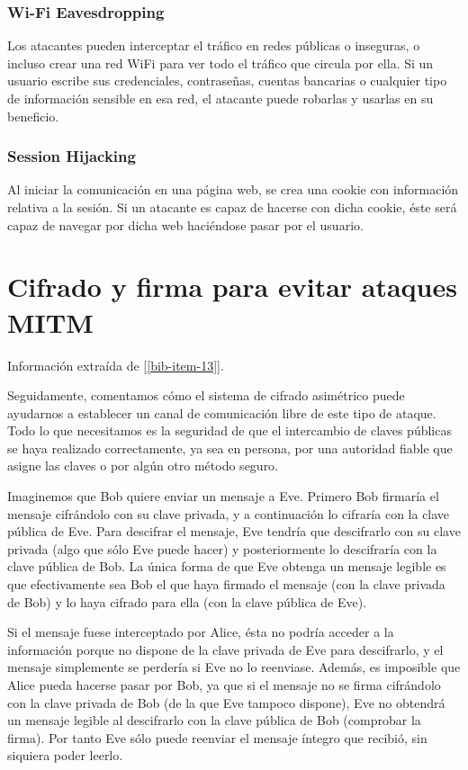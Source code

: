 \documentclass[11pt]{article}
\begin{document}
 \subsubsection*{Wi-Fi Eavesdropping}
 
 Los atacantes pueden interceptar el tráfico en redes públicas o inseguras, o incluso crear una red WiFi para ver todo el tráfico que circula por ella. Si un usuario escribe sus credenciales, contraseñas, cuentas bancarias o cualquier tipo de información sensible en esa red, el atacante puede robarlas y usarlas en su beneficio.
 
 \subsubsection*{Session Hijacking}
 
 Al iniciar la comunicación en una página web, se crea una cookie con información relativa a la sesión. Si un atacante es capaz de hacerse con dicha cookie, éste será capaz de navegar por dicha web haciéndose pasar por el usuario.

\section{Cifrado y firma para evitar ataques MITM}

Información extraída de [\ref{bib-item-13}].

Seguidamente, comentamos cómo el sistema de cifrado asimétrico puede ayudarnos a establecer un canal de comunicación libre de este tipo de ataque.
Todo lo que necesitamos es la seguridad de que el intercambio de claves públicas se haya realizado correctamente, ya sea en persona, por una
autoridad fiable que asigne las claves o por algún otro método seguro.

Imaginemos que Bob quiere enviar un mensaje a Eve. Primero Bob firmaría el mensaje cifrándolo con su clave privada, y a continuación lo cifraría
con la clave pública de Eve. Para descifrar el mensaje, Eve tendría que descifrarlo con su clave privada (algo que sólo Eve puede hacer) y posteriormente
lo descifraría con la clave pública de Bob. La única forma de que Eve obtenga un mensaje legible es que efectivamente sea Bob el que haya firmado el
 mensaje (con la clave privada de Bob) y lo haya cifrado para ella (con la clave pública de Eve).

Si el mensaje fuese interceptado por Alice, ésta no podría acceder a la información porque no dispone de la clave privada de Eve para descifrarlo,
y el mensaje simplemente se perdería si Eve no lo reenviase.
Además, es imposible que Alice pueda hacerse pasar por Bob, ya que si el mensaje no se firma cifrándolo con la clave privada de Bob (de la que Eve
tampoco dispone), Eve no obtendrá un mensaje legible al descifrarlo con la clave pública de Bob (comprobar la firma). Por tanto Eve sólo puede
reenviar el mensaje íntegro que recibió, sin siquiera poder leerlo.
\end{document}
